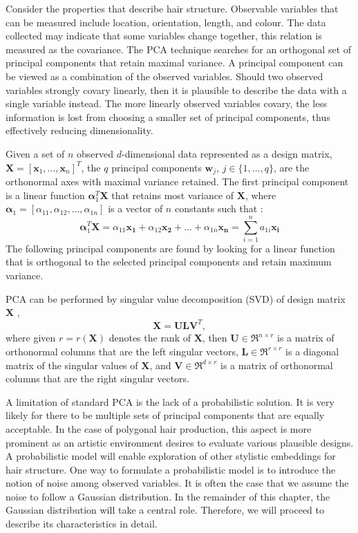 \documentclass[ %
author={Dillon Keith Diep},
supervisor={Dr. Carl Henrik Ek},
degree={MEng},
title={ART-CG Hair:},
subtitle={Assisted Real-time Content Generation of Stylised Virtual Hair},
type={Research},
year={2017} ]{dissertation}
\begin{document}
	Consider the properties that describe hair structure. Observable variables that can be measured include location, orientation, length, and colour. The data collected may indicate that some variables change together, this relation is measured as the covariance. The PCA technique searches for an orthogonal set of principal components that retain maximal variance. A principal component can be viewed as a combination of the observed variables. Should two observed variables strongly covary linearly, then it is plausible to describe the data with a single variable instead. The more linearly observed variables covary, the less information is lost from choosing a smaller set of principal components, thus effectively reducing dimensionality.
	
	Given a set of $n$ observed $d$-dimensional data represented as a design matrix, $\bm{X}=[\bm{x}_1,...,\bm{x}_n]^T$, the $q$ principal components $\bm{w}_j$, $j \in \{1,...,q\}$, are the orthonormal axes with maximal variance retained. The first principal component is a linear function $\bm{\alpha}^T_1\bm{X}$ that retains most variance of $\bm{X}$, where $\bm{\alpha}_1 = [\alpha_{11}, \alpha_{12}, ..., \alpha_{1n}]$ is a vector of $n$ constants such that \cite[p.4]{pca2002}:
	$$\bm{\alpha}^T_1\bm{X}=\alpha_{11}\bm{x_1}+\alpha_{12}\bm{x_2}+...+\alpha_{1n}\bm{x_n} = \sum^n_{i=1}a_{1i}\bm{x_i}$$
	The following principal components are found by looking for a linear function that is orthogonal to the selected principal components and retain maximum variance.
	
	PCA can be performed by singular value decomposition (SVD) of design matrix $\bm{X}$ \cite[pp.44-46]{pca2002},
	$$\bm{X=ULV}^T,$$
	where given $r = r(\bm{X})$ denotes the rank of $\bm{X}$, then
	$\bm{U} \in \Re^{n \times r}$ is a matrix of orthonormal columns that are the left singular vectors,
	$\bm{L} \in \Re^{r \times r}$ is a diagonal matrix of the singular values of $\bm{X}$, and
	$\bm{V} \in \Re^{d \times r}$ is a matrix of orthonormal columns that are the right singular vectors.
	
	A limitation of standard PCA is the lack of a probabilistic solution. 
	It is very likely for there to be multiple sets of principal components that are equally acceptable. In the case of polygonal hair production, this aspect is more prominent as an artistic environment desires to evaluate various plausible designs. A probabilistic model will enable exploration of other stylistic embeddings for hair structure. One way to formulate a probabilistic model is to introduce the notion of noise among observed variables. It is often the case that we assume the noise to follow a Gaussian distribution. In the remainder of this chapter, the Gaussian distribution will take a central role. Therefore, we will proceed to describe its characteristics in detail.
	
\end{document}
